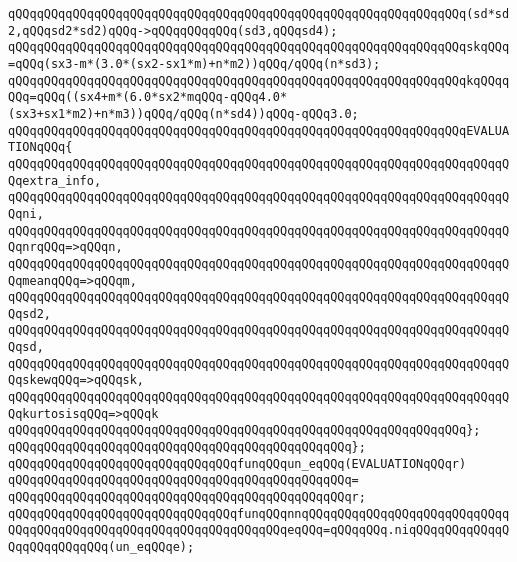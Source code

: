 \verb|qQQqqQQqqQQqqQQqqQQqqQQqqQQqqQQqqQQqqQQqqQQqqQQqqQQqqQQqqQQqqQQq(sd*sd2,qQQqsd2*sd2)qQQq->qQQqqQQqqQQq(sd3,qQQqsd4);|\newline
\newline
\verb|qQQqqQQqqQQqqQQqqQQqqQQqqQQqqQQqqQQqqQQqqQQqqQQqqQQqqQQqqQQqqQQqskqQQq=qQQq(sx3-m*(3.0*(sx2-sx1*m)+n*m2))qQQq/qQQq(n*sd3);|\newline
\verb|qQQqqQQqqQQqqQQqqQQqqQQqqQQqqQQqqQQqqQQqqQQqqQQqqQQqqQQqqQQqqQQqkqQQqqQQq=qQQq((sx4+m*(6.0*sx2*mqQQq-qQQq4.0*(sx3+sx1*m2)+n*m3))qQQq/qQQq(n*sd4))qQQq-qQQq3.0;|\newline
\newline
\verb|qQQqqQQqqQQqqQQqqQQqqQQqqQQqqQQqqQQqqQQqqQQqqQQqqQQqqQQqqQQqqQQqEVALUATIONqQQq{|\newline
\verb|qQQqqQQqqQQqqQQqqQQqqQQqqQQqqQQqqQQqqQQqqQQqqQQqqQQqqQQqqQQqqQQqqQQqqQQqextra_info,|\newline
\verb|qQQqqQQqqQQqqQQqqQQqqQQqqQQqqQQqqQQqqQQqqQQqqQQqqQQqqQQqqQQqqQQqqQQqqQQqni,|\newline
\verb|qQQqqQQqqQQqqQQqqQQqqQQqqQQqqQQqqQQqqQQqqQQqqQQqqQQqqQQqqQQqqQQqqQQqqQQqnrqQQq=>qQQqn,|\newline
\verb|qQQqqQQqqQQqqQQqqQQqqQQqqQQqqQQqqQQqqQQqqQQqqQQqqQQqqQQqqQQqqQQqqQQqqQQqmeanqQQq=>qQQqm,|\newline
\verb|qQQqqQQqqQQqqQQqqQQqqQQqqQQqqQQqqQQqqQQqqQQqqQQqqQQqqQQqqQQqqQQqqQQqqQQqsd2,|\newline
\verb|qQQqqQQqqQQqqQQqqQQqqQQqqQQqqQQqqQQqqQQqqQQqqQQqqQQqqQQqqQQqqQQqqQQqqQQqsd,|\newline
\verb|qQQqqQQqqQQqqQQqqQQqqQQqqQQqqQQqqQQqqQQqqQQqqQQqqQQqqQQqqQQqqQQqqQQqqQQqskewqQQq=>qQQqsk,|\newline
\verb|qQQqqQQqqQQqqQQqqQQqqQQqqQQqqQQqqQQqqQQqqQQqqQQqqQQqqQQqqQQqqQQqqQQqqQQqkurtosisqQQq=>qQQqk|\newline
\verb|qQQqqQQqqQQqqQQqqQQqqQQqqQQqqQQqqQQqqQQqqQQqqQQqqQQqqQQqqQQqqQQq};|\newline
\verb|qQQqqQQqqQQqqQQqqQQqqQQqqQQqqQQqqQQqqQQqqQQqqQQq};|\newline
\newline
\verb|qQQqqQQqqQQqqQQqqQQqqQQqqQQqqQQqfunqQQqun_eqQQq(EVALUATIONqQQqr)|\newline
\verb|qQQqqQQqqQQqqQQqqQQqqQQqqQQqqQQqqQQqqQQqqQQqqQQq=|\newline
\verb|qQQqqQQqqQQqqQQqqQQqqQQqqQQqqQQqqQQqqQQqqQQqqQQqr;|\newline
\newline
\verb|qQQqqQQqqQQqqQQqqQQqqQQqqQQqqQQqfunqQQqnnqQQqqQQqqQQqqQQqqQQqqQQqqQQqqQQqqQQqqQQqqQQqqQQqqQQqqQQqqQQqqQQqqQQqeqQQq=qQQqqQQq.niqQQqqQQqqQQqqQQqqQQqqQQqqQQq(un_eqQQqe);|\newline
